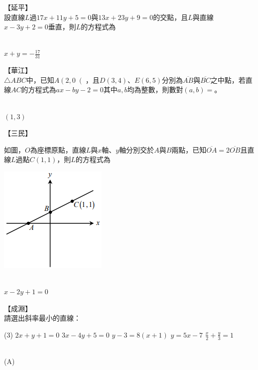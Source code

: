 \documentclass
[answers]
{exam}
\newcommand\ul[1]{\uline{\hspace*{#1}}}
\theoremstyle{definition}
\begin{document}
\begin{questions}
\question
【延平】\\
設直線$L$過$17x+11y+5=0$與$13x+23y+9=0$的交點，且$L$與直線$x-3y+2=0$垂直，則$L$的方程式為\ul{50pt}
\begin{solution}~\\
	$x + y = - \frac{17}{31}$
\end{solution}

\question
【華江】\\
$\triangle ABC$中，已知$A\left( 2,0\right($，且$D\left( 3,4\right)$、$E\left( 6,5\right)$分別為$\overline{AB}$與$\overline{BC}$之中點，若直線$AC$的方程式為$ax-by-2=0$其中$a,b$均為整數，則數對$\left( a,b \right)=$\ul{50pt}。
\begin{solution}~\\
	$\left( 1,3 \right)$
\end{solution}

\question
【三民】\\
\begin{minipage}[t]{0.7\linewidth}
	如圖，$O$為座標原點，直線$L$與$x$軸、$y$軸分別交於$A$與$B$兩點，已知$\overline{OA}=2\overline{OB}$且直線$L$過點$C\left( 1,1\right)$，則$L$的方程式為\ul{50pt}
\end{minipage}
\hfill
\begin{minipage}[t]{0.3\linewidth}
	\vspace*{-0.3cm}
	\includegraphics[scale=1]{./figure/10.png}
	\raggedleft %
\end{minipage}

\begin{solution}~\\
	$x-2y+1=0$
\end{solution}

\question
【成淵】\\
請選出斜率最小的直線：
\begin{tasks}(3)
	\task $2x+y+1=0$
	\task $3x-4y+5=0$
	\task $y-3=8\left( x+1\right)$
	\task $y=5x-7$
	\task $\frac{x}{2}+\frac{y}{3}=1$
\end{tasks}
\begin{solution}~\\
	(A)
\end{solution}


\end{questions}
\end{document}
